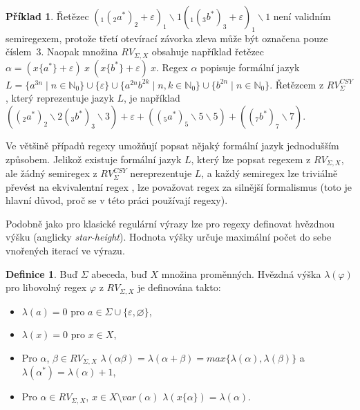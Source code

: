 \documentclass[thesis=B,czech]{FITthesis}[2019/12/23]
\theoremstyle{definition}
\newtheorem{definition}{Definice}[chapter]
\newtheorem{example}{Příklad}[chapter]
\begin{document}
\begin{example} 
Řetězec $(_1(_2 a^\ast )_2 + \varepsilon)_1 \backslash 1 (_1 (_3 b^\ast )_3 + \varepsilon )_1 \backslash 1 $ není validním semiregexem, protože třetí otevírací závorka zleva může být označena pouze číslem~3.  Naopak množina $RV_{\Sigma, X}$ obsahuje například řetězec $\alpha = (x \{ a^\ast \} +  \varepsilon)\  x \ (x\{b^\ast \} +  \varepsilon) \ x$. Regex $\alpha$ popisuje formální jazyk $L = \{a^{3n} \mid n \in \mathbb{N}_0 \} \cup \{\varepsilon\} \cup {\{a^{2n} b^{2k} \mid n, k \in \mathbb{N}_0 \}} \cup \{b^{2n} \mid n \in \mathbb{N}_0 \}$. Řetězcem z $RV_{\Sigma}^{CSY}$, který reprezentuje jazyk $L$, je například $((_2 a^\ast )_2 \backslash 2 (_3 b^\ast )_3  \backslash 3) + \varepsilon + ((_5 a^\ast )_5 \backslash 5 \backslash 5) + ((_7 b^\ast )_7 \backslash 7) $.
\end{example}

Ve většině případů regexy umožňují popsat nějaký formální jazyk jednodušším způsobem. Jelikož existuje formální jazyk $L$, který lze popsat regexem z $RV_{\Sigma, X}$, ale žádný semiregex z $RV_{\Sigma}^{CSY}$ nereprezentuje $L$, a každý semiregex lze triviálně převést na ekvivalentní regex \cite[s. 38--40]{berglund}, lze považovat regex za silnější formalismus (toto je hlavní důvod, proč se v této práci používají regexy).

Podobně jako pro klasické regulární výrazy \cite{eggan} lze pro regexy definovat hvězdnou výšku (anglicky \emph{star-height}). Hodnota výšky určuje maximální počet do sebe vnořených iterací ve výrazu. 

\begin{definition}
Buď $\Sigma$ abeceda, buď $X$ množina proměnných. Hvězdná výška $\lambda(\varphi)$ pro libovolný regex $\varphi$ z $RV_{\Sigma, X}$ je definována takto:
\begin{itemize}
	\item{$\lambda(a) = 0$ pro $a \in \Sigma\cup\{\varepsilon, \varnothing\}$,}
	\item{$\lambda(x) = 0$ pro $x \in X$,}
	\item{Pro $\alpha$, $\beta \in RV_{\Sigma, X}$ $\lambda(\alpha\beta) = \lambda(\alpha+\beta) = max\{\lambda(\alpha), \lambda(\beta)\}$ a  $\lambda(\alpha^\ast) = \lambda(\alpha)+1$,}
	\item{Pro $\alpha \in RV_{\Sigma, X}$, $x \in X\setminus var(\alpha)$ $\lambda(x\{\alpha\}) = \lambda(\alpha)$.}
\end{itemize}
\end{definition}
\end{document}
